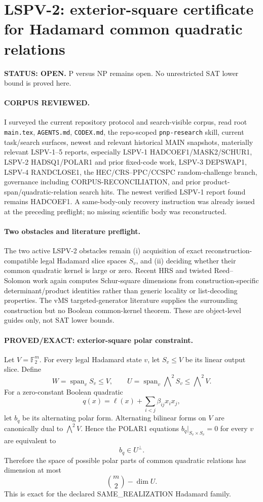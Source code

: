 \documentclass[11pt]{article}
\begin{document}
\section*{LSPV-2: exterior-square certificate for Hadamard common quadratic relations}
\textbf{STATUS: OPEN.} P versus NP remains open. No unrestricted SAT lower bound is proved here.

\paragraph{CORPUS REVIEWED.}
I surveyed the current repository protocol and search-visible corpus, read root \texttt{main.tex}, \texttt{AGENTS.md}, \texttt{CODEX.md}, the repo-scoped \texttt{pnp-research} skill, current task/search surfaces, newest and relevant historical MAIN snapshots, materially relevant LSPV-1--5 reports, especially LSPV-1 HADCOEF1/MASK2/SCHUR1, LSPV-2 HADSQ1/POLAR1 and prior fixed-code work, LSPV-3 DEPSWAP1, LSPV-4 RANDCLOSE1, the HEC/CRS--PPC/CCSPC random-challenge branch, governance including CORPUS-RECONCILIATION, and prior product-span/quadratic-relation search hits. The newest verified LSPV-1 report found remains HADCOEF1. A same-body-only recovery instruction was already issued at the preceding preflight; no missing scientific body was reconstructed.

\paragraph{Two obstacles and literature preflight.}
The two active LSPV-2 obstacles remain (i) acquisition of exact reconstruction-compatible legal Hadamard slice spaces \(S_v\), and (ii) deciding whether their common quadratic kernel is large or zero. Recent HRS and twisted Reed--Solomon work again computes Schur-square dimensions from construction-specific determinant/product identities rather than generic locality or list-decoding properties. The vMS targeted-generator literature supplies the surrounding construction but no Boolean common-kernel theorem. These are object-level guides only, not SAT lower bounds.

\paragraph{PROVED/EXACT: exterior-square polar constraint.}
Let \(V=\mathbb F_2^m\). For every legal Hadamard state \(v\), let \(S_v\le V\) be its linear output slice. Define
\[
W=\operatorname{span}_{v}S_v\le V,\qquad
U=\operatorname{span}_{v}\bigwedge\nolimits^2 S_v\le\bigwedge\nolimits^2 V.
\]
For a zero-constant Boolean quadratic
\[
q(x)=\ell(x)+\sum_{i<j}\beta_{ij}x_ix_j,
\]
let \(b_q\) be its alternating polar form. Alternating bilinear forms on \(V\) are canonically dual to \(\bigwedge^2V\). Hence the POLAR1 equations \(b_q|_{S_v\times S_v}=0\) for every \(v\) are equivalent to
\[
\boxed{b_q\in U^\perp.}
\]
Therefore the space of possible polar parts of common quadratic relations has dimension at most
\[
\boxed{\binom m2-\dim U.}
\]
This is exact for the declared SAME\_REALIZATION Hadamard family.
\end{document}
